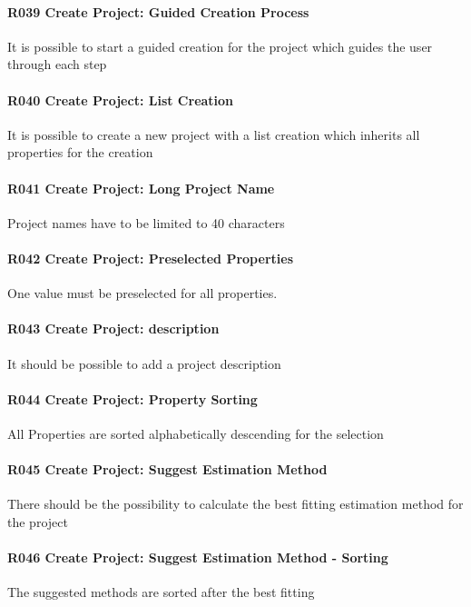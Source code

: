 \paragraph{R039 Create Project: Guided Creation Process}
It is possible to start a guided creation for the project which guides the user through each step

\paragraph{R040 Create Project: List Creation}
It is possible to create a new project with a list creation which inherits all properties for the creation

\paragraph{R041 Create Project: Long Project Name}
Project names have to be limited to 40 characters

\paragraph{R042 Create Project: Preselected Properties}
One value must be preselected for all properties.

\paragraph{R043 Create Project: description}
It should be possible to add a project description

\paragraph{R044 Create Project: Property Sorting}
All Properties are sorted alphabetically descending for the selection

\paragraph{R045 Create Project: Suggest Estimation Method}
There should be the possibility to calculate the best fitting estimation method for the project

\paragraph{R046 Create Project: Suggest Estimation Method - Sorting}
The suggested methods are sorted after the best fitting

